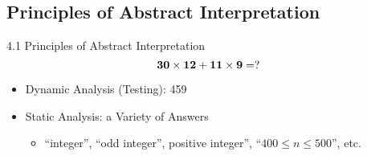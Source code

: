 \documentclass[10pt]{beamer}
\begin{document}
	\subsection{Principles of Abstract Interpretation}
	\begin{frame}{4.1 Principles of Abstract Interpretation}
		\[\bf
		30\times 12 + 11 \times 9 = ?
		\] \begin{itemize}
			\item Dynamic Analysis (Testing): 459
			\item Static Analysis: a Variety of Answers \begin{itemize}
				\item ``integer'', ``odd integer'', positive integer'', ``$400\leq n\leq 500$'', etc.
			\end{itemize}
		\end{itemize}
	\end{frame}
\end{document}
